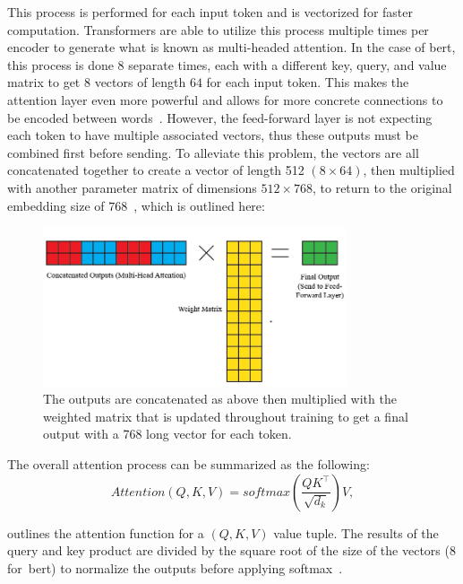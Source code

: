 This process is performed for each input token and is vectorized for faster computation. Transformers are able to utilize this process multiple times per encoder to generate what is known as multi-headed attention. In the case of \acrshort{bert}, this process is done $8$ separate times, each with a different key, query, and value matrix to get $8$ vectors of length $64$ for each input token. This makes the attention layer even more powerful and allows for more concrete connections to be encoded between words~\parencite{transformers:}. However, the feed-forward layer is not expecting each token to have multiple associated vectors, thus these outputs must be combined first before sending. To alleviate this problem, the vectors are all concatenated together to create a vector of length 512 $(8 \times 64)$, then multiplied with another parameter matrix of dimensions $512 \times 768$, to return to the original embedding size of $768$~\parencite{devlin2019bert:}, which is outlined here:

\begin{figure}[H]
\centering
\includegraphics[width=0.8\textwidth]{fig/multi-head.jpg}
\caption{The outputs are concatenated as above then multiplied with the weighted matrix that is updated throughout training to get a final output with a 768 long vector for each token.
}
\label{fig:multi_head_attention}
\end{figure}

The overall attention process can be summarized as the following:
\begin{equation}
\label{eq:attention}
Attention\left(Q, K, V\right) = softmax\left(\frac{QK^\top}{\sqrt{d_k}}\right)V, 
\end{equation}

 outlines the attention function for a $(Q,K,V)$ value tuple. The results of the query and key product are divided by the square root of the size of the vectors (8 for~\acrshort{bert}) to normalize the outputs before applying softmax~\parencite{transformers:}.

